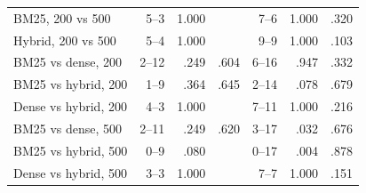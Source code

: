 \begin{table}[h!]
\begin{tabular}{@{}lrrrrrr@{}}
  BM25, 200 vs 500 & 5--3 & 1.000 &  & 7--6 & 1.000 & .320 \\
  Hybrid, 200 vs 500 & 5--4 & 1.000 &  & 9--9 & 1.000 & .103 \\
  BM25 vs dense, 200 & 2--12 & .249 & .604 & 6--16 & .947 & .332 \\
  BM25 vs hybrid, 200 & 1--9 & .364 & .645 & 2--14 & .078 & .679 \\
  Dense vs hybrid, 200 & 4--3 & 1.000 &  & 7--11 & 1.000 & .216 \\
  BM25 vs dense, 500 & 2--11 & .249 & .620 & 3--17 & .032 & .676 \\
  BM25 vs hybrid, 500 & 0--9 & .080 &  & 0--17 & .004 & .878 \\
  Dense vs hybrid, 500 & 3--3 & 1.000 &  & 7--7 & 1.000 & .151 \\
  \bottomrule
  \end{tabular}
\end{table}

\newpage

